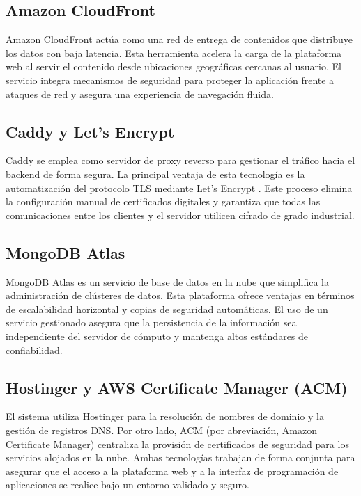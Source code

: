 \subsection{Amazon CloudFront}

Amazon CloudFront \cite{aws_cloudfront} actúa como una red de entrega de contenidos que distribuye los datos con baja latencia. Esta herramienta acelera la carga de la plataforma web al servir el contenido desde ubicaciones geográficas cercanas al usuario. El servicio integra mecanismos de seguridad para proteger la aplicación frente a ataques de red y asegura una experiencia de navegación fluida.

\subsection{Caddy y Let's Encrypt}

Caddy \cite{caddy_server} se emplea como servidor de proxy reverso para gestionar el tráfico hacia el backend de forma segura. La principal ventaja de esta tecnología es la automatización del protocolo TLS mediante Let's Encrypt \cite{letsencrypt_org}. Este proceso elimina la configuración manual de certificados digitales y garantiza que todas las comunicaciones entre los clientes y el servidor utilicen cifrado de grado industrial.

\subsection{MongoDB Atlas}

MongoDB Atlas es un servicio de base de datos en la nube que simplifica la administración de clústeres de datos. Esta plataforma ofrece ventajas en términos de escalabilidad horizontal y copias de seguridad automáticas. El uso de un servicio gestionado asegura que la persistencia de la información sea independiente del servidor de cómputo y mantenga altos estándares de confiabilidad.

\subsection{Hostinger y AWS Certificate Manager (ACM)}

El sistema utiliza Hostinger \cite{hostinger_web} para la resolución de nombres de dominio y la gestión de registros DNS. Por otro lado, ACM (por abreviación, Amazon Certificate Manager) centraliza la provisión de certificados de seguridad para los servicios alojados en la nube. Ambas tecnologías trabajan de forma conjunta para asegurar que el acceso a la plataforma web y a la interfaz de programación de aplicaciones se realice bajo un entorno validado y seguro.
